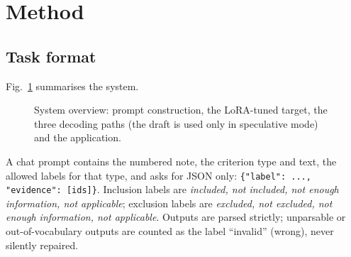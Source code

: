 \documentclass[conference]{IEEEtran}
\begin{document}
\section{Method}
\subsection{Task format}
Fig.~\ref{fig:arch} summarises the system.
\begin{figure}[H]\centering
{}
\caption{System overview: prompt construction, the LoRA-tuned target, the three decoding paths (the draft is used only in speculative mode) and the application.}\label{fig:arch}\end{figure}

A chat prompt contains the numbered note, the criterion type and text, the allowed labels for that type, and asks for JSON only: \texttt{\{"label": ..., "evidence": [ids]\}}. Inclusion labels are \emph{included, not included, not enough information, not applicable}; exclusion labels are \emph{excluded, not excluded, not enough information, not applicable}. Outputs are parsed strictly; unparsable or out-of-vocabulary outputs are counted as the label ``invalid'' (wrong), never silently repaired.
\end{document}
